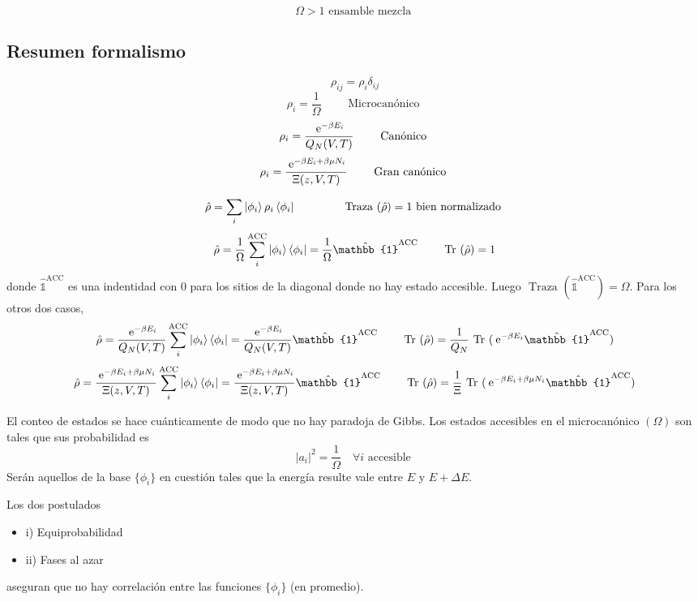 \documentclass[10pt,oneside]{CBFT_book}
\begin{document}
\[
	\Omega > 1 \text{ ensamble mezcla }
\]

\subsection{Resumen formalismo}

\[
	\rho_{ij} = \rho_i \delta_{ij}
\]
\[
	\rho_i = \frac{1}{\Omega} \qquad \text{ Microcanónico }
\]
\[
	\rho_i = \frac{\:\mathrm{e}^{-\beta E_i}}{Q_N(V,T)}  \qquad  \text{ Canónico }
\]
\[
	\rho_i = \frac{\:\mathrm{e}^{-\beta E_i + \beta \mu N_i }}{\Xi(z,V,T)}  \qquad  \text{ Gran canónico }
\]

\[
	\hat{\rho} = \sum_i \Ket{ \phi_i } \rho_i \Bra{ \phi_i } \qquad \qquad \text{ Traza }(\hat{\rho} ) =
	1 \text{ bien normalizado }
\]
\[
	\hat{\rho} = \frac{1}{\Omega} \sum_i^{\text{ACC}} \Ket{ \phi_i } \Bra{ \phi_i } = 
	\frac{1}{\Omega} \hat{\mathbb{1}}^{\text{ACC}}  \qquad \text{ Tr }(\hat{\rho} ) = 1 
\]
donde $ \hat{\mathbb{1}}^{\text{ACC}}  $ es una indentidad con 0 para los sitios de la diagonal donde no hay
estado accesible. Luego $ \text{ Traza }(\hat{\mathbb{1}}^{\text{ACC}})  = \Omega $. Para los otros dos casos,
\[
	\hat{\rho} = \frac{\euler^{-\beta E_i}}{Q_N(V,T)}  \sum_i^{\text{ACC}} \Ket{ \phi_i } \Bra{ \phi_i } = 
	\frac{\euler^{-\beta E_i}}{Q_N(V,T)} \hat{\mathbb{1}}^{\text{ACC}} 
	\qquad \text{ Tr }(\hat{\rho} ) = \frac{1}{Q_N} \text{ Tr }( \euler^{-\beta E_i} \hat{\mathbb{1}}^{\text{ACC}} )
\]
\[
	\hat{\rho} = \frac{\euler^{-\beta E_i + \beta \mu N_i }}{\Xi(z,V,T)} 
	\sum_i^{\text{ACC}} \Ket{ \phi_i } \Bra{ \phi_i } = 
	\frac{\euler^{-\beta E_i + \beta \mu N_i }}{\Xi(z,V,T)} \hat{\mathbb{1}}^{\text{ACC}} 
	\qquad \text{ Tr }(\hat{\rho} ) = 
	\frac{1}{\Xi} \text{ Tr }( \euler^{-\beta E_i + \beta \mu N_i } \hat{\mathbb{1}}^{\text{ACC}} ) 
\]

El conteo de estados se hace cuánticamente de modo que no hay paradoja de Gibbs. Los estados accesibles en el
microcanónico $ (\Omega) $ son tales que sus probabilidad es 
\[
	| a_i |^2 = \frac{1}{\Omega} \quad \forall i \text{ accesible }
\]
Serán aquellos de la base $ \{ \phi_i \} $ en cuestión tales que la energía resulte vale entre $E$ y $E+\Delta E$.

Los dos postulados
\begin{itemize}
 \item i) Equiprobabilidad
 \item ii) Fases al azar
\end{itemize}
aseguran que no hay correlación entre las funciones $ \{ \phi_i \} $ (en promedio).
\end{document}
